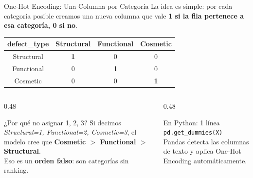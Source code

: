 \documentclass[aspectratio=169]{beamer}
\newcommand{\tech}[1]{\texttt{\textcolor{mainColor}{#1}}}
\begin{document}
\begin{frame}{One-Hot Encoding: Una Columna por Categoría}
  \small
  La idea es simple: por cada categoría posible creamos una nueva columna que vale \textbf{1 si la fila pertenece a esa categoría, 0 si no}.

  \vspace{0.25cm}
  \centering
  {\footnotesize
  \begin{tabular}{|c||c|c|c|}
    \hline
    \textbf{defect\_type} & \textbf{Structural} & \textbf{Functional} & \textbf{Cosmetic} \\\hline\hline
    Structural & \textbf{1} & 0 & 0 \\\hline
    Functional & 0 & \textbf{1} & 0 \\\hline
    Cosmetic & 0 & 0 & \textbf{1} \\\hline
  \end{tabular}}

  \vspace{0.3cm}
  \begin{columns}[T]
    \begin{column}{0.48\textwidth}
      \begin{alertblock}{\faTimesCircle\enspace ¿Por qué no asignar 1, 2, 3?}
        \small
        Si decimos \textit{Structural=1, Functional=2, Cosmetic=3}, el modelo cree que \textbf{Cosmetic $>$ Functional $>$ Structural}.\\[3pt]
        Eso es un \textbf{orden falso}: son categorías sin ranking.
      \end{alertblock}
    \end{column}
    \begin{column}{0.48\textwidth}
      \begin{conceptbox}{\faPython\enspace En Python: 1 línea}
        \small
        \tech{pd.get\_dummies(X)}\\[4pt]
        Pandas detecta las columnas de texto y aplica One-Hot Encoding automáticamente.
      \end{conceptbox}
    \end{column}
  \end{columns}
\end{frame}
\end{document}
